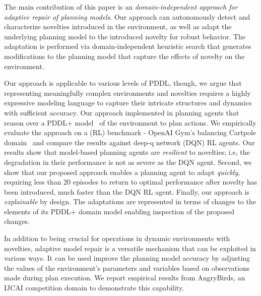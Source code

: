 \documentclass[letterpaper]{article} %
\begin{document}
The main contribution of this paper is an \emph{domain-independent approach for adaptive repair of planning models}. Our approach can autonomously detect and characterize novelties introduced in the environment, as well as adapt the underlying planning model to the introduced novelty for robust behavior. The adaptation is performed via domain-independent heuristic search that generates modifications to the planning model that capture the effects of novelty on the environment.

Our approach is applicable to various levels of PDDL, though, we argue that representing meaningfully complex environments and novelties requires a highly expressive modeling language to capture their intricate structures and dynamics with sufficient accuracy. Our approach implemented in planning agents that reason over a PDDL+ model~\cite{fox2006modelling} of the environment to plan actions.
We empirically evaluate the approach on a (RL) benchmark - OpenAI Gym's balancing Cartpole domain~\cite{barto1983neuronlike,brockman2016openai} and compare the results against deep-q network (DQN) RL agents. Our results show that model-based planning agents are \emph{resilient} to novelties; i.e, the degradation in their performance is not as severe as the DQN agent. Second, we show that our proposed approach enables a planning agent to adapt \emph{quickly}, requiring less than $20$ episodes to return to optimal performance after novelty has been introduced, much faster than the DQN RL agent. Finally, our approach is  \emph{explainable} by design. The adaptations are represented in terms of changes to the elements of its PDDL+ domain model enabling inspection of the proposed changes.

In addition to being crucial for operations in dynamic environments with novelties, adaptive model repair is a versatile mechanism that can be exploited in various ways. It can be used improve the planning model accuracy by adjusting the values of the environment's parameters and variables based on observations made during plan execution. We report empirical results from AngryBirds, an IJCAI competition domain to demonstrate this capability.
\end{document}
